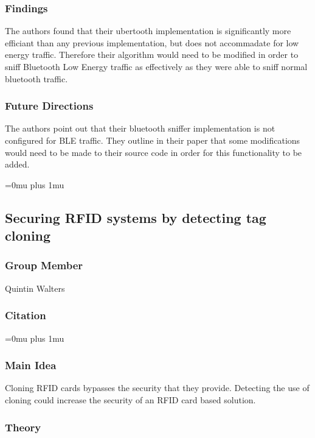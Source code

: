 \subsubsection{Findings}

\noindent
The authors found that their ubertooth implementation is significantly more efficiant than any previous implementation, but does not accommadate for low energy traffic. Therefore their algorithm would need to be modified in order to sniff Bluetooth Low Energy traffic as effectively as they were able to sniff normal bluetooth traffic.

\subsubsection{Future Directions}

\noindent
The authors point out that their bluetooth sniffer implementation is not configured for BLE traffic. They outline in their paper that some modifications would need to be made to their source code in order for this functionality to be added.

\Urlmuskip=0mu plus 1mu\relax

\noindent
\subsection{Securing RFID systems by detecting tag cloning}

\subsubsection{Group Member}

\noindent
Quintin Walters

\noindent
\subsubsection{Citation}

\Urlmuskip=0mu plus 1mu\relax

\subsubsection{Main Idea}

\noindent
Cloning RFID cards bypasses the security that they provide.  Detecting the use of cloning could increase the security of an RFID card based solution.

\subsubsection{Theory}

